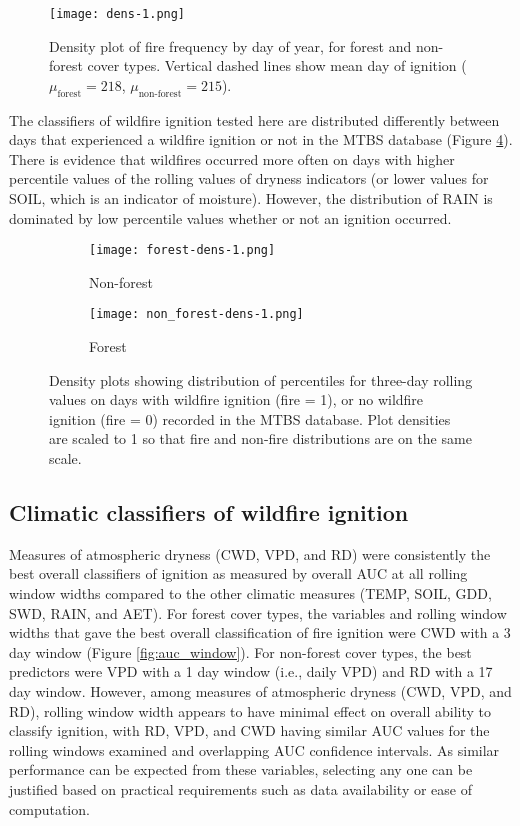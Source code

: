 \documentclass[11p]{article}
\begin{document}
\begin{table}
{\begin{figure}[htbp]
  \texttt{[image: dens-1.png]}
  \caption{Density plot of fire frequency by day of year, for forest and non-forest cover types. Vertical dashed lines show mean day of ignition ($\mu_{\text{forest}} = 218$, $\mu_{\text{non-forest}} = 215$).}
  \label{fig:fire-dens}
\end{figure}

The classifiers of wildfire ignition tested here are distributed differently between days that experienced a wildfire ignition or not in the MTBS database (Figure \ref{fig:dens}). There is evidence that wildfires occurred more often on days with higher percentile values of the rolling values of dryness indicators (or lower values for SOIL, which is an indicator of moisture). However, the distribution of RAIN is dominated by low percentile values whether or not an ignition occurred.  

\begin{figure}[htbp]
  \centering
  \begin{subfigure}{.5\textwidth}
    \centering
    \texttt{[image: forest-dens-1.png]}
    \caption{Non-forest}
    \label{fig:dens-nf}
  \end{subfigure}%
  \begin{subfigure}{.5\textwidth}
    \centering
    \texttt{[image: non\_forest-dens-1.png]}
    \caption{Forest}
    \label{fig:dens-f}
  \end{subfigure}
  \caption{Density plots showing distribution of percentiles for three-day rolling values on days with wildfire ignition (fire = 1), or no wildfire ignition (fire = 0) recorded in the MTBS database. Plot densities are scaled to 1 so that fire and non-fire distributions are on the same scale.}
  \label{fig:dens}
\end{figure}

\subsection{Climatic classifiers of wildfire ignition}

Measures of atmospheric dryness (CWD, VPD, and RD) were consistently the best overall classifiers of ignition as measured by overall AUC at all rolling window widths compared to the other climatic measures (TEMP, SOIL, GDD, SWD, RAIN, and AET). For forest cover types, the variables and rolling window widths that gave the best overall classification of fire ignition were CWD with a 3 day window (Figure \ref{fig:auc_window}). For non-forest cover types, the best predictors were VPD with a 1 day window (i.e., daily VPD) and RD with a 17 day window. However, among measures of atmospheric dryness (CWD, VPD, and RD), rolling window width appears to have minimal effect on overall ability to classify ignition, with RD, VPD, and CWD having similar AUC values for the rolling windows examined and overlapping AUC confidence intervals. As similar performance can be expected from these variables, selecting any one can be justified based on practical requirements such as data availability or ease of computation.

}
\end{table}
\end{document}
